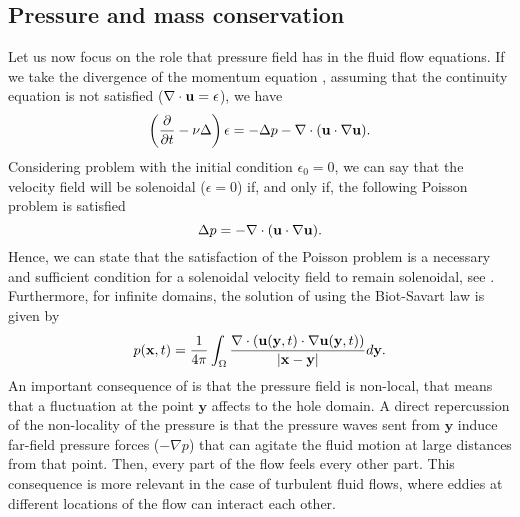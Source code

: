 \subsection{Pressure and mass conservation}
\label{subsec-pressure_mass_conservation}
Let us now focus on the role that pressure field has in the fluid flow equations. If we take the divergence of the momentum equation , assuming that the continuity equation  is not satisfied ($\nabla\cdot{\bf u}=\epsilon$), we have
\begin{equation}
\label{eq-NS_div_momentum}
\left(\frac{\partial}{\partial t}-\nu\Delta\right)\epsilon=-\Delta p-\nabla\cdot({\bf u}\cdot\nabla{\bf u}).
\end{equation}
Considering problem  with the initial condition $\epsilon_0=0$, we can say that the velocity field will be solenoidal ($\epsilon=0$) if, and only if, the following Poisson problem is satisfied
\begin{equation}
\label{eq-NS_poisson}
\Delta p=-\nabla\cdot({\bf u}\cdot\nabla{\bf u}).
\end{equation}
Hence, we can state that the satisfaction of the Poisson problem  is a necessary and sufficient condition for a solenoidal velocity field to remain solenoidal, see \cite{pope_turbulent_2000}. Furthermore, for infinite domains, the solution of  using the Biot-Savart law is given by 
\begin{equation}
\label{eq-NS_poisson_solution}
p({\bf x},t)=\frac{1}{4\pi}\int_\Omega\frac{\nabla\cdot({\bf u}(\mathbf{y},t)\cdot\nabla{\bf u}(\mathbf{y},t))}{|{\bf x}-\mathbf{y}|}d\mathbf{y}.
\end{equation}
An important consequence of  is that the pressure field is non-local, that means that a fluctuation at the point $\mathbf{y}$ affects to the hole domain. A direct repercussion of the non-locality of the pressure is that the pressure waves sent from $\mathbf{y}$ induce far-field pressure forces ($-\nabla p$) that can agitate the fluid motion at large distances from that point. Then, every part of the flow feels every other part. This consequence is more relevant in the case of turbulent fluid flows, where eddies at different locations of the flow can interact each other. 
